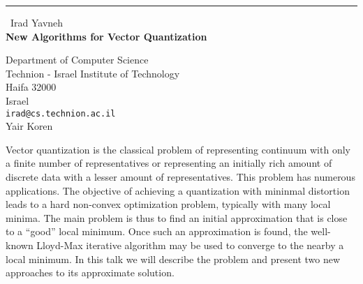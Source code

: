 \documentclass{report}
\begin{document}
\begin{center}
\rule{6in}{1pt} \
{\large Irad Yavneh \\
{\bf New Algorithms for Vector Quantization}}

Department of Computer Science \\ Technion - Israel Institute of Technology \\ Haifa 32000 \\ Israel
\\
{\tt irad@cs.technion.ac.il}\\
Yair Koren\end{center}

Vector quantization is the classical problem of representing continuum
with only a finite number of representatives or representing an initially
rich amount of discrete data with a lesser amount of representatives.
This problem has numerous applications. The objective of achieving a
quantization with mininmal distortion leads to a hard non-convex
optimization problem, typically with many local minima. The main problem
is thus to find an initial approximation that is close to a
``good'' local minimum. Once such an approximation is found, the
well-known Lloyd-Max iterative algorithm may be used to converge to the
nearby a local minimum. In this talk we will describe the problem and
present two new approaches to its approximate solution.
\end{document}
